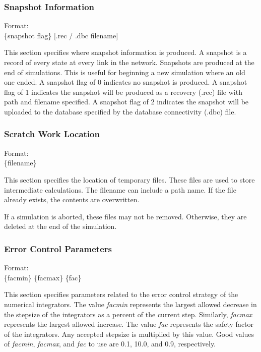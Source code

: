 \documentclass[12pt]{article}
\newenvironment{codeindent}
{\begin{list}{}
        {\setlength{\leftmargin}{.1in}}
        \item[]
}
{\end{list}}
\begin{document}
 
\subsubsection{Snapshot Information} \label{sec: snapshot info}

\begin{codeindent}
Format: \\
\{snapshot flag\} [.rec / .dbc filename]
\end{codeindent}
 
This section specifies where snapshot information is produced. A snapshot is a record of every state at every link in the network. Snapshots are produced at the end of simulations. This is useful for beginning a new simulation where an old one ended. A snapshot flag of 0 indicates no snapshot is produced. A snapshot flag of 1 indicates the snapshot will be produced as a recovery (.rec) file with path and filename specified. A snapshot flag of 2 indicates the snapshot will be uploaded to the database specified by the database connectivity (.dbc) file.

\subsubsection{Scratch Work Location} \label{sec: scratch work location}

\begin{codeindent}
Format: \\
\{filename\}
\end{codeindent}

This section specifies the location of temporary files. These files are used to store intermediate calculations. The filename can include a path name. If the file already exists, the contents are overwritten.

If a simulation is aborted, these files may not be removed. Otherwise, they are deleted at the end of the simulation.
 
\subsubsection{Error Control Parameters} \label{sec: error control parameters}

\begin{codeindent}
Format: \\
\{facmin\} \{facmax\} \{fac\}
\end{codeindent}

This section specifies parameters related to the error control strategy of the numerical integrators. The value \textit{facmin} represents the largest allowed decrease in the stepsize of the integrators as a percent of the current step. Similarly, \textit{facmax} represents the largest allowed increase. The value \textit{fac} represents the safety factor of the integrators. Any accepted stepsize is multiplied by this value. Good values of \textit{facmin}, \textit{facmax}, and \textit{fac} to use are 0.1, 10.0, and 0.9, respectively.
\end{document}

